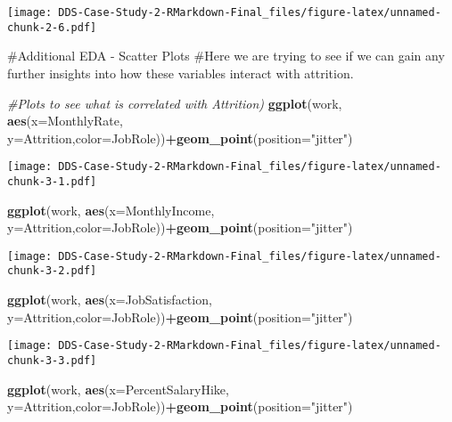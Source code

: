 \documentclass[]{article}
\newenvironment{Shaded}{\begin{snugshade}}{\end{snugshade}}
\newcommand{\CommentTok}[1]{\textcolor[rgb]{0.56,0.35,0.01}{\textit{#1}}}
\newcommand{\DataTypeTok}[1]{\textcolor[rgb]{0.13,0.29,0.53}{#1}}
\newcommand{\KeywordTok}[1]{\textcolor[rgb]{0.13,0.29,0.53}{\textbf{#1}}}
\newcommand{\NormalTok}[1]{#1}
\newcommand{\OperatorTok}[1]{\textcolor[rgb]{0.81,0.36,0.00}{\textbf{#1}}}
\newcommand{\StringTok}[1]{\textcolor[rgb]{0.31,0.60,0.02}{#1}}
\begin{document}
\texttt{[image: DDS-Case-Study-2-RMarkdown-Final\_files/figure-latex/unnamed-chunk-2-6.pdf]}

\#Additional EDA - Scatter Plots \#Here we are trying to see if we can
gain any further insights into how these variables interact with
attrition.

\begin{Shaded}
\begin{Highlighting}[]
\CommentTok{#Plots to see what is correlated with Attrition)}
\KeywordTok{ggplot}\NormalTok{(work, }\KeywordTok{aes}\NormalTok{(}\DataTypeTok{x=}\NormalTok{MonthlyRate, }\DataTypeTok{y=}\NormalTok{Attrition,}\DataTypeTok{color=}\NormalTok{JobRole))}\OperatorTok{+}\KeywordTok{geom_point}\NormalTok{(}\DataTypeTok{position=}\StringTok{"jitter"}\NormalTok{)}
\end{Highlighting}
\end{Shaded}

\texttt{[image: DDS-Case-Study-2-RMarkdown-Final\_files/figure-latex/unnamed-chunk-3-1.pdf]}

\begin{Shaded}
\begin{Highlighting}[]
\KeywordTok{ggplot}\NormalTok{(work, }\KeywordTok{aes}\NormalTok{(}\DataTypeTok{x=}\NormalTok{MonthlyIncome, }\DataTypeTok{y=}\NormalTok{Attrition,}\DataTypeTok{color=}\NormalTok{JobRole))}\OperatorTok{+}\KeywordTok{geom_point}\NormalTok{(}\DataTypeTok{position=}\StringTok{"jitter"}\NormalTok{)}
\end{Highlighting}
\end{Shaded}

\texttt{[image: DDS-Case-Study-2-RMarkdown-Final\_files/figure-latex/unnamed-chunk-3-2.pdf]}

\begin{Shaded}
\begin{Highlighting}[]
\KeywordTok{ggplot}\NormalTok{(work, }\KeywordTok{aes}\NormalTok{(}\DataTypeTok{x=}\NormalTok{JobSatisfaction, }\DataTypeTok{y=}\NormalTok{Attrition,}\DataTypeTok{color=}\NormalTok{JobRole))}\OperatorTok{+}\KeywordTok{geom_point}\NormalTok{(}\DataTypeTok{position=}\StringTok{"jitter"}\NormalTok{)}
\end{Highlighting}
\end{Shaded}

\texttt{[image: DDS-Case-Study-2-RMarkdown-Final\_files/figure-latex/unnamed-chunk-3-3.pdf]}

\begin{Shaded}
\begin{Highlighting}[]
\KeywordTok{ggplot}\NormalTok{(work, }\KeywordTok{aes}\NormalTok{(}\DataTypeTok{x=}\NormalTok{PercentSalaryHike, }\DataTypeTok{y=}\NormalTok{Attrition,}\DataTypeTok{color=}\NormalTok{JobRole))}\OperatorTok{+}\KeywordTok{geom_point}\NormalTok{(}\DataTypeTok{position=}\StringTok{"jitter"}\NormalTok{)}
\end{Highlighting}
\end{Shaded}
\end{document}
